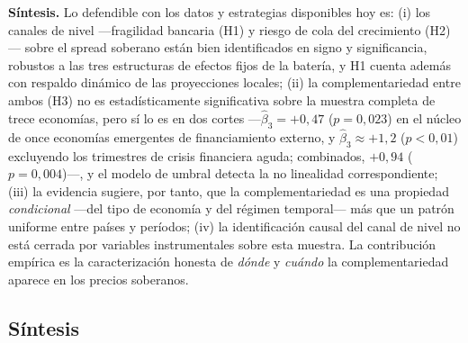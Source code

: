 \textbf{Síntesis.} Lo defendible con los datos y estrategias disponibles hoy es: (i) los canales de nivel —fragilidad bancaria (H1) y riesgo de cola del crecimiento (H2)— sobre el spread soberano están bien identificados en signo y significancia, robustos a las tres estructuras de efectos fijos de la batería, y H1 cuenta además con respaldo dinámico de las proyecciones locales; (ii) la complementariedad entre ambos (H3) no es estadísticamente significativa sobre la muestra completa de trece economías, pero sí lo es en dos cortes —$\hat\beta_3=+0{,}47$ ($p=0{,}023$) en el núcleo de once economías emergentes de financiamiento externo, y $\hat\beta_3\approx+1{,}2$ ($p<0{,}01$) excluyendo los trimestres de crisis financiera aguda; combinados, $+0{,}94$ ($p=0{,}004$)—, y el modelo de umbral detecta la no linealidad correspondiente; (iii) la evidencia sugiere, por tanto, que la complementariedad es una propiedad \emph{condicional} —del tipo de economía y del régimen temporal— más que un patrón uniforme entre países y períodos; (iv) la identificación causal del canal de nivel no está cerrada por variables instrumentales sobre esta muestra. La contribución empírica es la caracterización honesta de \emph{dónde} y \emph{cuándo} la complementariedad aparece en los precios soberanos.

\subsection{Síntesis}

